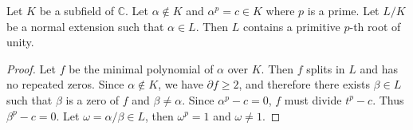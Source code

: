 \begin{theorem} \label{thm:unity-3}
	Let $K$ be a subfield of $\mathbb C$. Let $\alpha \notin K$ and $\alpha^p = c \in K$ where $p$ is a prime. Let $L / K$ be a normal extension such that $\alpha \in L$. Then $L$ contains a primitive $p$-th root of unity.
\end{theorem}

\begin{proof}
	Let $f$ be the minimal polynomial of $\alpha$ over $K$. Then $f$ splits in $L$ and has no repeated zeros. Since $\alpha \notin K$, we have $\partial f \ge 2$, and therefore there exists $\beta \in L$ such that $\beta$ is a zero of $f$ and $\beta \neq \alpha$. Since $\alpha ^ p - c = 0$, $f$ must divide $t ^ p - c$. Thus $\beta^p - c = 0$. Let $\omega=\alpha / \beta \in L $, then $\omega^p=1$ and $\omega \neq 1$.
\end{proof}
